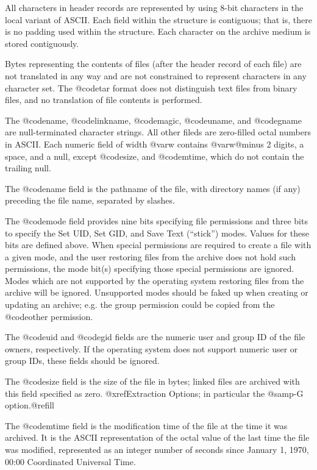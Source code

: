 All characters in header records are represented by using 8-bit
characters in the local variant of ASCII.  Each field within the
structure is contiguous; that is, there is no padding used within
the structure.  Each character on the archive medium is stored
contiguously.

Bytes representing the contents of files (after the header record of
each file) are not translated in any way and are not constrained to
represent characters in any character set.  The @code{tar} format
does not distinguish text files from binary files, and no
translation of file contents is performed.

The @code{name}, @code{linkname}, @code{magic}, @code{uname}, and
@code{gname} are null-terminated character strings.  All other
fileds are zero-filled octal numbers in ASCII.  Each numeric field
of width @var{w} contains @var{w}@minus 2 digits, a space, and a null,
except @code{size}, and @code{mtime}, which do not contain the
trailing null.

The @code{name} field is the pathname of the file, with directory
names (if any) preceding the file name, separated by slashes.

The @code{mode} field provides nine bits specifying file permissions
and three bits to specify the Set UID, Set GID, and Save Text
(``stick'') modes.  Values for these bits are defined above.  When
special permissions are required to create a file with a given mode,
and the user restoring files from the archive does not hold such
permissions, the mode bit(s) specifying those special permissions
are ignored.  Modes which are not supported by the operating system
restoring files from the archive will be ignored.  Unsupported modes
should be faked up when creating or updating an archive; e.g. the
group permission could be copied from the @code{other} permission.

The @code{uid} and @code{gid} fields are the numeric user and group
ID of the file owners, respectively.  If the operating system does
not support numeric user or group IDs, these fields should be
ignored.

The @code{size} field is the size of the file in bytes; linked files
are archived with this field specified as zero.
@xref{Extraction Options}; in particular the @samp{-G} option.@refill

The @code{mtime} field is the modification time of the file at the
time it was archived.  It is the ASCII representation of the octal
value of the last time the file was modified, represented as an
integer number of seconds since January 1, 1970, 00:00 Coordinated
Universal Time.

